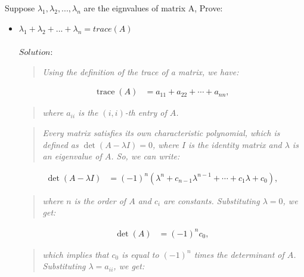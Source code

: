 \documentclass[a4paper]{article}
\begin{document}
        \subsection{}
        Suppose $\lambda_{1},\lambda_{2},...,\lambda_{n}$ are the eignvalues of matrix A, Prove: 
                \begin{itemize}
        \item $\lambda_{1}+\lambda_{2}+...+\lambda_{n}=trace(A)$\\
        \\
        $Solution:$ \\
            \begin{quote}
                \emph{Using the definition of the trace of a matrix, we have:}
            \end{quote}

            \begin{align*} \operatorname{trace}(A) &= a_{11} + a_{22} + \cdots + a_{nn}, \end{align*}
            
            \begin{quote}
                \emph{where $a_{ii}$ is the $(i,i)$-th entry of $A$.}
            \end{quote}
            \begin{quote}
                \emph{Every matrix satisfies its own characteristic polynomial, which is defined as $\det(A - \lambda I) = 0$, where $I$ is the identity matrix and $\lambda$ is an eigenvalue of $A$. So, we can write:}
            \end{quote}
            
            \begin{align*} \det(A - \lambda I) &= (-1)^n (\lambda^n + c_{n-1} \lambda^{n-1} + \cdots + c_1 \lambda + c_0), \end{align*}
            
            \begin{quote}
                \emph{where $n$ is the order of $A$ and $c_i$ are constants. Substituting $\lambda = 0$, we get:}
            \end{quote}
            
            \begin{align*} \det(A) &= (-1)^n c_0, \end{align*}
            
            \begin{quote}
                \emph{which implies that $c_0$ is equal to $(-1)^n$ times the determinant of $A$.}
                \emph{Substituting $\lambda = a_{ii}$, we get:}
            \end{quote}
            

\end{itemize}
\end{document}
